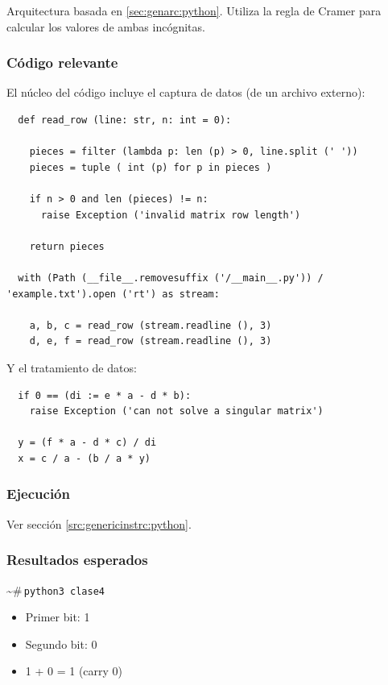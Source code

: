 \documentclass{article}[12pt,a4paper]
\newcommand{\bashps}{\textasciitilde\#\,}
\begin{document}
Arquitectura basada en \ref{sec:genarc:python}. Utiliza la regla de Cramer para calcular los valores de ambas incógnitas.

\subsubsection{Código relevante}

El núcleo del código incluye el captura de datos (de un archivo externo):

\begin{verbatim}
  def read_row (line: str, n: int = 0):

    pieces = filter (lambda p: len (p) > 0, line.split (' '))
    pieces = tuple ( int (p) for p in pieces )

    if n > 0 and len (pieces) != n:
      raise Exception ('invalid matrix row length')

    return pieces

  with (Path (__file__.removesuffix ('/__main__.py')) / 'example.txt').open ('rt') as stream:

    a, b, c = read_row (stream.readline (), 3)
    d, e, f = read_row (stream.readline (), 3)
\end{verbatim}

Y el tratamiento de datos:

\begin{verbatim}
  if 0 == (di := e * a - d * b):
    raise Exception ('can not solve a singular matrix')

  y = (f * a - d * c) / di
  x = c / a - (b / a * y)
\end{verbatim}

\subsubsection{Ejecución}

Ver sección \ref{src:genericinstrc:python}.

\subsubsection{Resultados esperados}

\bashps\texttt{python3 clase4}

\begin{itemize}
  \item[] Primer bit: 1
  \item[] Segundo bit: 0
  \item[] 1 + 0 = 1 (carry 0)
\end{itemize}
\end{document}
